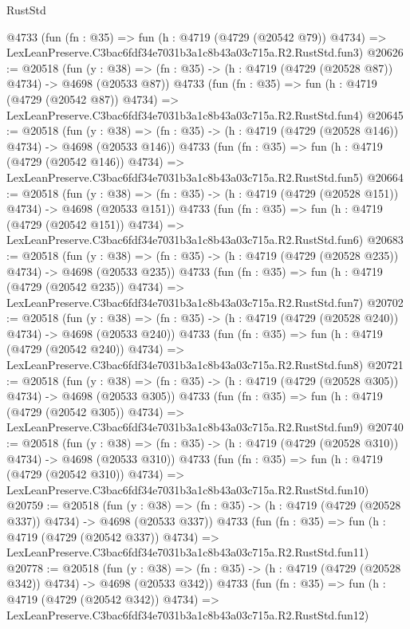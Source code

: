 \begin{lexlean}{RustStd}
\begin{coremodule}
    @4733
    (fun (fn : @35) =>
    fun (h : @4719 (@4729 (@20542 @79)) @4734) =>
    LexLeanPreserve.C3bac6fdf34e7031b3a1c8b43a03c715a.R2.RustStd.fun3)
@20626 := @20518
    (fun (y : @38) => (fn : @35) -> (h : @4719 (@4729 (@20528 @87)) @4734) -> @4698 (@20533 @87))
    @4733
    (fun (fn : @35) =>
    fun (h : @4719 (@4729 (@20542 @87)) @4734) =>
    LexLeanPreserve.C3bac6fdf34e7031b3a1c8b43a03c715a.R2.RustStd.fun4)
@20645 := @20518
    (fun (y : @38) => (fn : @35) -> (h : @4719 (@4729 (@20528 @146)) @4734) -> @4698 (@20533 @146))
    @4733
    (fun (fn : @35) =>
    fun (h : @4719 (@4729 (@20542 @146)) @4734) =>
    LexLeanPreserve.C3bac6fdf34e7031b3a1c8b43a03c715a.R2.RustStd.fun5)
@20664 := @20518
    (fun (y : @38) => (fn : @35) -> (h : @4719 (@4729 (@20528 @151)) @4734) -> @4698 (@20533 @151))
    @4733
    (fun (fn : @35) =>
    fun (h : @4719 (@4729 (@20542 @151)) @4734) =>
    LexLeanPreserve.C3bac6fdf34e7031b3a1c8b43a03c715a.R2.RustStd.fun6)
@20683 := @20518
    (fun (y : @38) => (fn : @35) -> (h : @4719 (@4729 (@20528 @235)) @4734) -> @4698 (@20533 @235))
    @4733
    (fun (fn : @35) =>
    fun (h : @4719 (@4729 (@20542 @235)) @4734) =>
    LexLeanPreserve.C3bac6fdf34e7031b3a1c8b43a03c715a.R2.RustStd.fun7)
@20702 := @20518
    (fun (y : @38) => (fn : @35) -> (h : @4719 (@4729 (@20528 @240)) @4734) -> @4698 (@20533 @240))
    @4733
    (fun (fn : @35) =>
    fun (h : @4719 (@4729 (@20542 @240)) @4734) =>
    LexLeanPreserve.C3bac6fdf34e7031b3a1c8b43a03c715a.R2.RustStd.fun8)
@20721 := @20518
    (fun (y : @38) => (fn : @35) -> (h : @4719 (@4729 (@20528 @305)) @4734) -> @4698 (@20533 @305))
    @4733
    (fun (fn : @35) =>
    fun (h : @4719 (@4729 (@20542 @305)) @4734) =>
    LexLeanPreserve.C3bac6fdf34e7031b3a1c8b43a03c715a.R2.RustStd.fun9)
@20740 := @20518
    (fun (y : @38) => (fn : @35) -> (h : @4719 (@4729 (@20528 @310)) @4734) -> @4698 (@20533 @310))
    @4733
    (fun (fn : @35) =>
    fun (h : @4719 (@4729 (@20542 @310)) @4734) =>
    LexLeanPreserve.C3bac6fdf34e7031b3a1c8b43a03c715a.R2.RustStd.fun10)
@20759 := @20518
    (fun (y : @38) => (fn : @35) -> (h : @4719 (@4729 (@20528 @337)) @4734) -> @4698 (@20533 @337))
    @4733
    (fun (fn : @35) =>
    fun (h : @4719 (@4729 (@20542 @337)) @4734) =>
    LexLeanPreserve.C3bac6fdf34e7031b3a1c8b43a03c715a.R2.RustStd.fun11)
@20778 := @20518
    (fun (y : @38) => (fn : @35) -> (h : @4719 (@4729 (@20528 @342)) @4734) -> @4698 (@20533 @342))
    @4733
    (fun (fn : @35) =>
    fun (h : @4719 (@4729 (@20542 @342)) @4734) =>
    LexLeanPreserve.C3bac6fdf34e7031b3a1c8b43a03c715a.R2.RustStd.fun12)

\end{coremodule}
\end{lexlean}
